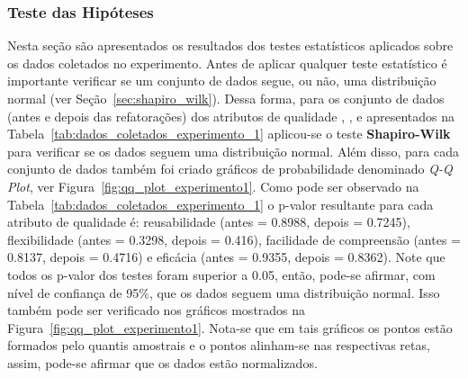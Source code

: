 \subsubsection{Teste das Hipóteses}

Nesta seção são apresentados os resultados dos testes estatísticos aplicados sobre os dados coletados no experimento. Antes de aplicar qualquer teste estatístico é importante verificar se um conjunto de dados segue, ou não, uma distribuição normal (ver Seção~\ref{sec:shapiro_wilk}). Dessa forma, para os conjunto de dados (antes e depois das refatorações) dos atributos de qualidade , ,  e  apresentados na Tabela~\ref{tab:dados_coletados_experimento_1} aplicou-se o teste \textbf{Shapiro-Wilk} para verificar se os dados seguem uma distribuição normal. Além disso, para cada conjunto de dados também foi criado gráficos de probabilidade denominado \textit{Q-Q Plot}, ver Figura~\ref{fig:qq_plot_experimento1}. Como pode ser observado na Tabela~\ref{tab:dados_coletados_experimento_1} o p-valor resultante para cada atributo de qualidade é: reusabilidade (antes = 0.8988, depois = 0.7245), flexibilidade (antes = 0.3298, depois = 0.416), facilidade de compreensão (antes = 0.8137, depois = 0.4716) e eficácia (antes = 0.9355, depois = 0.8362). Note que todos os p-valor dos testes foram superior a 0.05, então, pode-se afirmar, com nível de confiança de 95\%, que os dados seguem uma distribuição normal. Isso também pode ser verificado nos gráficos mostrados na Figura~\ref{fig:qq_plot_experimento1}. Nota-se que em tais gráficos os pontos estão formados pelo quantis amostrais e o pontos alinham-se nas respectivas retas, assim, pode-se afirmar que os dados estão normalizados.

